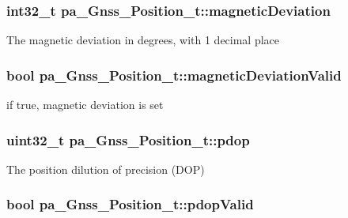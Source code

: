 \subsubsection[{\texorpdfstring{magnetic\+Deviation}{magneticDeviation}}]{\setlength{\rightskip}{0pt plus 5cm}int32\+\_\+t pa\+\_\+\+Gnss\+\_\+\+Position\+\_\+t\+::magnetic\+Deviation}\hypertarget{structpa___gnss___position__t_ae7e64db034ccdae6989aa690153b5cea}{}\label{structpa___gnss___position__t_ae7e64db034ccdae6989aa690153b5cea}
The magnetic deviation in degrees, with 1 decimal place 
\subsubsection[{\texorpdfstring{magnetic\+Deviation\+Valid}{magneticDeviationValid}}]{\setlength{\rightskip}{0pt plus 5cm}bool pa\+\_\+\+Gnss\+\_\+\+Position\+\_\+t\+::magnetic\+Deviation\+Valid}\hypertarget{structpa___gnss___position__t_a43847779aa9bad04445b02ec7d40380e}{}\label{structpa___gnss___position__t_a43847779aa9bad04445b02ec7d40380e}


if true, magnetic deviation is set 

\subsubsection[{\texorpdfstring{pdop}{pdop}}]{\setlength{\rightskip}{0pt plus 5cm}uint32\+\_\+t pa\+\_\+\+Gnss\+\_\+\+Position\+\_\+t\+::pdop}\hypertarget{structpa___gnss___position__t_ad4a591dd481f876540d9b8ed20cabcdc}{}\label{structpa___gnss___position__t_ad4a591dd481f876540d9b8ed20cabcdc}


The position dilution of precision (D\+OP) 

\subsubsection[{\texorpdfstring{pdop\+Valid}{pdopValid}}]{\setlength{\rightskip}{0pt plus 5cm}bool pa\+\_\+\+Gnss\+\_\+\+Position\+\_\+t\+::pdop\+Valid}\hypertarget{structpa___gnss___position__t_a03bb52ad2b22096d3842d1b598f8777a}{}\label{structpa___gnss___position__t_a03bb52ad2b22096d3842d1b598f8777a}


